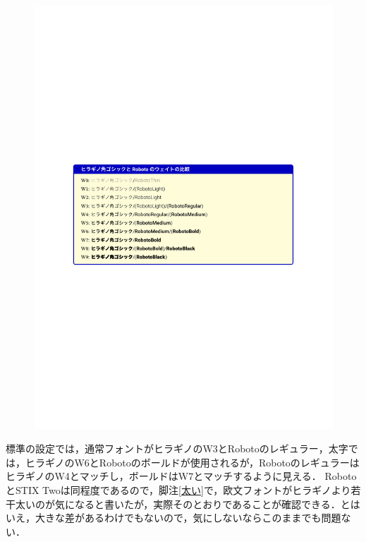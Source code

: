 \begin{figure}[ht]
\centering
\hspace*{-1em}\includegraphics[scale=1.0,clip]{hira.pdf}
\label{hira}
\end{figure}
標準の設定では，通常フォントがヒラギノのW3とRobotoのレギュラー，太字では，ヒラギノのW6とRobotoのボールドが使用されるが，RobotoのレギュラーはヒラギノのW4とマッチし，ボールドはW7とマッチするように見える．
RobotoとSTIX Twoは同程度であるので，脚注\ref{太い}で，欧文フォントがヒラギノより若干太いのが気になると書いたが，実際そのとおりであることが確認できる．とはいえ，大きな差があるわけでもないので，気にしないならこのままでも問題ない．

